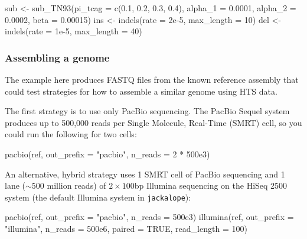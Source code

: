 \documentclass[12pt,]{article}
\newenvironment{Shaded}{}{}
\newcommand{\DataTypeTok}[1]{#1}
\newcommand{\DecValTok}[1]{#1}
\newcommand{\FloatTok}[1]{#1}
\newcommand{\KeywordTok}[1]{\textcolor[rgb]{0.00,0.00,1.00}{#1}}
\newcommand{\NormalTok}[1]{#1}
\newcommand{\OperatorTok}[1]{#1}
\newcommand{\OtherTok}[1]{\textcolor[rgb]{1.00,0.25,0.00}{#1}}
\newcommand{\StringTok}[1]{\textcolor[rgb]{0.00,0.50,0.50}{#1}}
\begin{document}
\begin{Shaded}
\begin{Highlighting}[]
\NormalTok{sub <-}\StringTok{ }\KeywordTok{sub_TN93}\NormalTok{(}\DataTypeTok{pi_tcag =} \KeywordTok{c}\NormalTok{(}\FloatTok{0.1}\NormalTok{, }\FloatTok{0.2}\NormalTok{, }\FloatTok{0.3}\NormalTok{, }\FloatTok{0.4}\NormalTok{),}
                \DataTypeTok{alpha_1 =} \FloatTok{0.0001}\NormalTok{, }\DataTypeTok{alpha_2 =} \FloatTok{0.0002}\NormalTok{,}
                \DataTypeTok{beta =} \FloatTok{0.00015}\NormalTok{)}
\NormalTok{ins <-}\StringTok{ }\KeywordTok{indels}\NormalTok{(}\DataTypeTok{rate =} \FloatTok{2e-5}\NormalTok{, }\DataTypeTok{max_length =} \DecValTok{10}\NormalTok{)}
\NormalTok{del <-}\StringTok{ }\KeywordTok{indels}\NormalTok{(}\DataTypeTok{rate =} \FloatTok{1e-5}\NormalTok{, }\DataTypeTok{max_length =} \DecValTok{40}\NormalTok{)}
\end{Highlighting}
\end{Shaded}

\hypertarget{assembling-a-genome}{%
\subsubsection{Assembling a genome}\label{assembling-a-genome}}

The example here produces FASTQ files from the known reference assembly that could
test strategies for how to assemble a similar genome using HTS data.

The first strategy is to use only PacBio sequencing.
The PacBio Sequel system produces up to 500,000 reads per
Single Molecule, Real-Time (SMRT) cell, so you could
run the following for two cells:

\begin{Shaded}
\begin{Highlighting}[]
\KeywordTok{pacbio}\NormalTok{(ref, }\DataTypeTok{out_prefix =} \StringTok{"pacbio"}\NormalTok{, }\DataTypeTok{n_reads =} \DecValTok{2} \OperatorTok{*}\StringTok{ }\FloatTok{500e3}\NormalTok{)}
\end{Highlighting}
\end{Shaded}

An alternative, hybrid strategy uses
1 SMRT cell of PacBio sequencing and
1 lane (\(\sim 500\) million reads) of \(2 \times 100\)bp Illumina
sequencing on the HiSeq 2500 system (the default Illumina system in \texttt{jackalope}):

\begin{Shaded}
\begin{Highlighting}[]
\KeywordTok{pacbio}\NormalTok{(ref, }\DataTypeTok{out_prefix =} \StringTok{"pacbio"}\NormalTok{, }\DataTypeTok{n_reads =} \FloatTok{500e3}\NormalTok{)}
\KeywordTok{illumina}\NormalTok{(ref, }\DataTypeTok{out_prefix =} \StringTok{"illumina"}\NormalTok{, }\DataTypeTok{n_reads =} \FloatTok{500e6}\NormalTok{, }\DataTypeTok{paired =} \OtherTok{TRUE}\NormalTok{,}
         \DataTypeTok{read_length =} \DecValTok{100}\NormalTok{)}
\end{Highlighting}
\end{Shaded}
\end{document}
